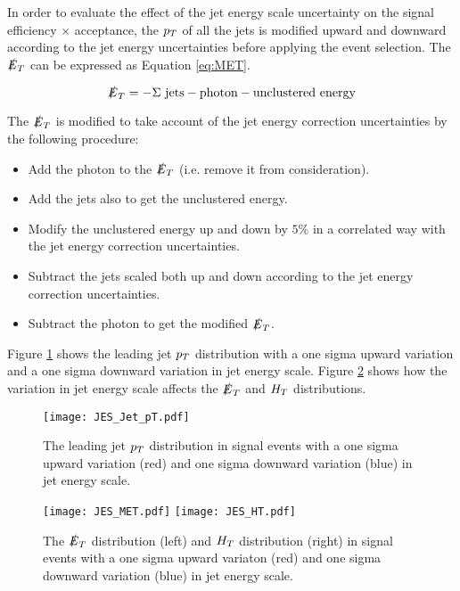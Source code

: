 In order to evaluate the effect of the jet energy scale uncertainty on the
signal efficiency $\times$ acceptance, the $p_{T}$ of all the jets is modified 
upward and downward according to the jet energy uncertainties before applying 
the event selection. The $\slashed{E}_{T}$ can be expressed as Equation \ref{eq:MET}.

\begin{equation}
\slashed{E}_{T} = -\Sigma \mbox{ jets} - \mbox{photon} - \mbox{unclustered energy}
\label{eq:MET}
\end{equation}

The $\slashed{E}_{T}$ is modified to take account of the jet energy correction
uncertainties by the following procedure: 

\begin{itemize}
\item Add the photon to the $\slashed{E}_{T}$ (i.e. remove it from consideration).
\item Add the jets also to get the unclustered energy.
\item Modify the unclustered energy up and down by $5\unit{\%}$ in a correlated
way with the jet energy correction uncertainties.
\item Subtract the jets scaled both up and down according to the jet energy 
correction uncertainties.
\item Subtract the photon to get the modified $\slashed{E}_{T}$.
\end{itemize}

Figure \ref{fig:JES_Jet_pT} shows the leading jet $p_{T}$ distribution with a one 
sigma upward variation and a one sigma downward variation in jet energy scale. 
Figure \ref{fig:JES_MET_And_HT} shows how the variation in jet energy scale 
affects the $\slashed{E}_{T}$ and $H_{T}$ distributions. \\

\begin{figure}
\begin{center}
\texttt{[image: JES\_Jet\_pT.pdf]}
\end{center}
\caption{The leading jet $p_{T}$ distribution in signal events with a one sigma
upward variation (red) and one sigma downward variation (blue) in jet energy
scale.}
\label{fig:JES_Jet_pT}
\end{figure}

\begin{figure}
\texttt{[image: JES\_MET.pdf]}
\texttt{[image: JES\_HT.pdf]}
\caption{The $\slashed{E}_{T}$ distribution (left) and $H_{T}$ distribution (right) in signal
events with a one sigma upward variaton (red) and one sigma downward variation
(blue) in jet energy scale.}
\label{fig:JES_MET_And_HT}
\end{figure}

